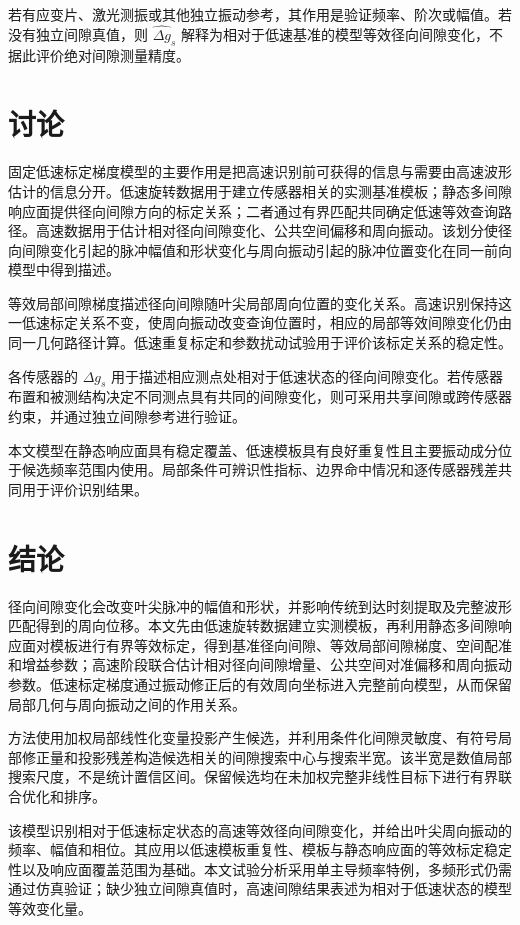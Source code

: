 \documentclass[UTF8,12pt,a4paper]{ctexart}
\begin{document}
若有应变片、激光测振或其他独立振动参考，其作用是验证频率、阶次或幅值。若没有独立间隙真值，则 $\widehat{\Delta g}_s$ 解释为相对于低速基准的模型等效径向间隙变化，不据此评价绝对间隙测量精度。

\section{讨论}

固定低速标定梯度模型的主要作用是把高速识别前可获得的信息与需要由高速波形估计的信息分开。低速旋转数据用于建立传感器相关的实测基准模板；静态多间隙响应面提供径向间隙方向的标定关系；二者通过有界匹配共同确定低速等效查询路径。高速数据用于估计相对径向间隙变化、公共空间偏移和周向振动。该划分使径向间隙变化引起的脉冲幅值和形状变化与周向振动引起的脉冲位置变化在同一前向模型中得到描述。

等效局部间隙梯度描述径向间隙随叶尖局部周向位置的变化关系。高速识别保持这一低速标定关系不变，使周向振动改变查询位置时，相应的局部等效间隙变化仍由同一几何路径计算。低速重复标定和参数扰动试验用于评价该标定关系的稳定性。

各传感器的 $\Delta g_s$ 用于描述相应测点处相对于低速状态的径向间隙变化。若传感器布置和被测结构决定不同测点具有共同的间隙变化，则可采用共享间隙或跨传感器约束，并通过独立间隙参考进行验证。

本文模型在静态响应面具有稳定覆盖、低速模板具有良好重复性且主要振动成分位于候选频率范围内使用。局部条件可辨识性指标、边界命中情况和逐传感器残差共同用于评价识别结果。

\section{结论}

径向间隙变化会改变叶尖脉冲的幅值和形状，并影响传统到达时刻提取及完整波形匹配得到的周向位移。本文先由低速旋转数据建立实测模板，再利用静态多间隙响应面对模板进行有界等效标定，得到基准径向间隙、等效局部间隙梯度、空间配准和增益参数；高速阶段联合估计相对径向间隙增量、公共空间对准偏移和周向振动参数。低速标定梯度通过振动修正后的有效周向坐标进入完整前向模型，从而保留局部几何与周向振动之间的作用关系。

方法使用加权局部线性化变量投影产生候选，并利用条件化间隙灵敏度、有符号局部修正量和投影残差构造候选相关的间隙搜索中心与搜索半宽。该半宽是数值局部搜索尺度，不是统计置信区间。保留候选均在未加权完整非线性目标下进行有界联合优化和排序。

该模型识别相对于低速标定状态的高速等效径向间隙变化，并给出叶尖周向振动的频率、幅值和相位。其应用以低速模板重复性、模板与静态响应面的等效标定稳定性以及响应面覆盖范围为基础。本文试验分析采用单主导频率特例，多频形式仍需通过仿真验证；缺少独立间隙真值时，高速间隙结果表述为相对于低速状态的模型等效变化量。
\end{document}
